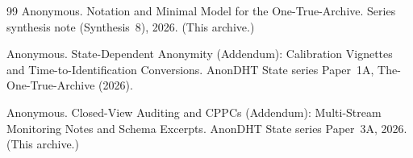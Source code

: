 \documentclass[11pt]{article}
\begin{document}
\begin{thebibliography}{99}
Anonymous.
\newblock Notation and Minimal Model for the One-True-Archive.
\newblock Series synthesis note (Synthesis~8), 2026. (This archive.)



Anonymous.
\newblock State-Dependent Anonymity (Addendum): Calibration Vignettes and Time-to-Identification Conversions.
\newblock AnonDHT State series Paper~1A, The-One-True-Archive (2026).

Anonymous.
\newblock Closed-View Auditing and CPPCs (Addendum): Multi-Stream Monitoring Notes and Schema Excerpts.
\newblock AnonDHT State series Paper~3A, 2026. (This archive.)

\end{thebibliography}
\end{document}
